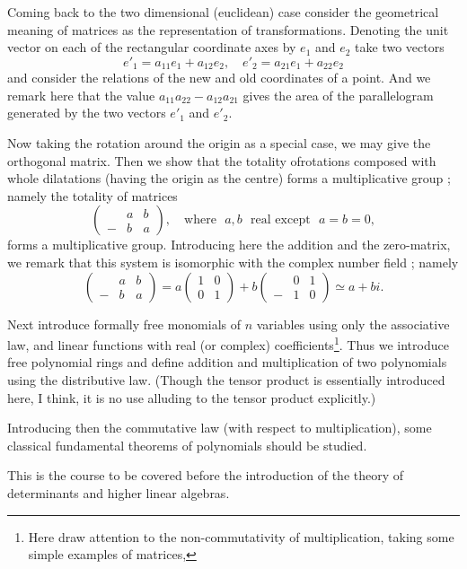 Coming back to the two dimensional (euclidean) case consider the
geometrical meaning of matrices as the representation of
transformations. Denoting the unit vector on each of the rectangular
coordinate axes by $e_1$ and $e_2$ take two vectors
$$
e'_1 = a_{11} e_1 + a_{12} e_2, \quad e'_2 = a_{21} e_1 + a_{22} e_2
$$
and consider the relations of the new and old coordinates of a
point. And we remark here that the value $a_{11} a_{22} - a_{12}
a_{21}$ gives the area of the parallelogram generated by the two
vectors $e'_1$ and $e'_2$.

Now taking the rotation around the origin as a special case, we may
give the orthogonal matrix. Then we show that the totality
of\pageoriginale rotations composed with whole dilatations (having the
origin as the centre) forms a multiplicative group ; namely the
totality of matrices
$$
\begin{pmatrix}
& a & b\\
- & b & a
\end{pmatrix}, \text{ ~ where~ } a, b \text{~ real except ~} a = b = 0,
$$
forms a multiplicative group. Introducing here the addition and the
zero-matrix, we remark that this system is isomorphic with the complex
number field ; namely
$$
\begin{pmatrix}
& a & b\\
-&b&a
\end{pmatrix} = a 
\begin{pmatrix}
1& 0\\
0&1
\end{pmatrix} +b 
\begin{pmatrix}
&0&1\\
-&1&0
\end{pmatrix} \simeq a + b i.
$$

Next introduce formally free monomials of $n$ variables using only the
associative law, and linear functions with real (or complex)
coefficients\footnote{Here draw attention to the non-commutativity of
  multiplication, taking some simple examples of matrices,}. Thus we
introduce free polynomial rings and define addition and multiplication
of two polynomials using the distributive law. (Though the tensor
product is essentially introduced here, I think, it is no use alluding
to the tensor product explicitly.)

Introducing then the commutative law (with respect to multiplication),
some classical fundamental theorems of polynomials should be studied.

This is the course to be covered before the introduction of the theory
of determinants and higher linear algebras.

